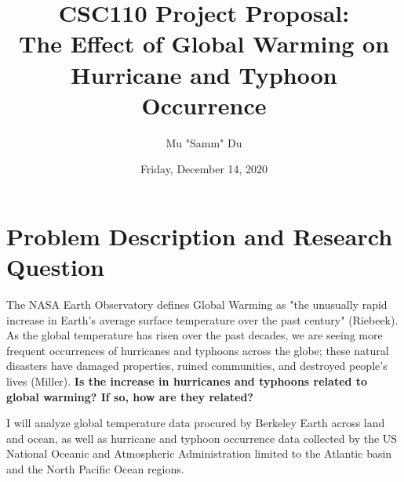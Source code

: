 \documentclass[fontsize=11pt]{article}
\title{CSC110 Project Proposal: \\The Effect of Global Warming on Hurricane and Typhoon Occurrence}
\author{Mu "Samm" Du}
\date{Friday, December 14, 2020}
\begin{document}
\maketitle

\section*{Problem Description and Research Question}

\qquad The NASA Earth Observatory defines Global Warming as "the unusually rapid increase in Earth’s average surface temperature over the past century" (Riebeek). As the global temperature has risen over the past decades, we are seeing more frequent occurrences of hurricanes and typhoons across the globe; these natural disasters have damaged properties, ruined communities, and destroyed people's lives (Miller). \textbf{Is the increase in hurricanes and typhoons related to global warming? If so, how are they related?} 

\enspace I will analyze global temperature data procured by Berkeley Earth across land and ocean, as well as hurricane and typhoon occurrence data collected by the US National Oceanic and Atmospheric Administration limited to the Atlantic basin and the North Pacific Ocean regions.
\end{document}
